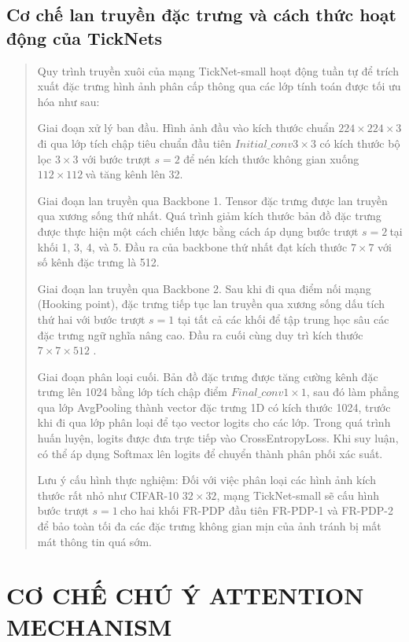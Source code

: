 \documentclass[
  12pt,
  a4paper,
]{report}
\begin{document}
\subsection{Cơ chế lan truyền đặc trưng và cách thức hoạt động của
TickNets}\label{cux1a1-chux1ebf-lan-truyux1ec1n-ux111ux1eb7c-trux1b0ng-vuxe0-cuxe1ch-thux1ee9c-houx1ea1t-ux111ux1ed9ng-cux1ee7a-ticknets}

\begin{quote}
Quy trình truyền xuôi của mạng TickNet-small hoạt động tuần tự để trích
xuất đặc trưng hình ảnh phân cấp thông qua các lớp tính toán được tối ưu
hóa như sau:

Giai đoạn xử lý ban đầu. Hình ảnh đầu vào kích thước chuẩn
\(224 \times 224 \times 3\) đi qua lớp tích chập tiêu chuẩn đầu tiên
\(Initial\_ conv3 \times 3\) có kích thước bộ lọc \(3 \times 3\) với
bước trượt \(s = 2\) để nén kích thước không gian xuống
\(112 \times 112\ \)và tăng kênh lên 32.

Giai đoạn lan truyền qua Backbone 1. Tensor đặc trưng được lan truyền
qua xương sống thứ nhất. Quá trình giảm kích thước bản đồ đặc trưng được
thực hiện một cách chiến lược bằng cách áp dụng bước trượt
\(s = 2\ \)tại khối 1, 3, 4, và 5. Đầu ra của backbone thứ nhất đạt kích
thước \(7 \times 7\) với số kênh đặc trưng là 512.

Giai đoạn lan truyền qua Backbone 2. Sau khi đi qua điểm nối mạng
(Hooking point), đặc trưng tiếp tục lan truyền qua xương sống dấu tích
thứ hai với bước trượt \(s = 1\) tại tất cả các khối để tập trung học
sâu các đặc trưng ngữ nghĩa nâng cao. Đầu ra cuối cùng duy trì kích
thước \(7 \times 7 \times 512\) .

Giai đoạn phân loại cuối. Bản đồ đặc trưng được tăng cường kênh đặc
trưng lên 1024 bằng lớp tích chập điểm \(Final\_ conv1 \times 1\), sau
đó làm phẳng qua lớp AvgPooling thành vector đặc trưng 1D có kích thước
1024, trước khi đi qua lớp phân loại để tạo vector logits cho các lớp.
Trong quá trình huấn luyện, logits được đưa trực tiếp vào
CrossEntropyLoss. Khi suy luận, có thể áp dụng Softmax lên logits để
chuyển thành phân phối xác suất.

Lưu ý cấu hình thực nghiệm: Đối với việc phân loại các hình ảnh kích
thước rất nhỏ như CIFAR-10 \(32 \times 32\), mạng TickNet-small sẽ cấu
hình bước trượt \(s = 1\ \)cho hai khối FR-PDP đầu tiên FR-PDP-1 và
FR-PDP-2 để bảo toàn tối đa các đặc trưng không gian mịn của ảnh tránh
bị mất mát thông tin quá sớm.
\end{quote}

\section{CƠ CHẾ CHÚ Ý ATTENTION
MECHANISM}\label{cux1a1-chux1ebf-chuxfa-uxfd-attention-mechanism}
\end{document}
